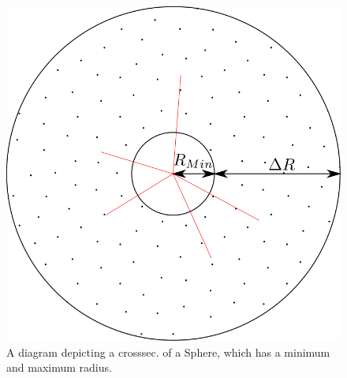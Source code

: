 \documentclass[12pt,a4paper]{article}
\begin{document}
\begin{figure}[h!]
\centering
\includegraphics[scale=0.2]{Images//Materials//RMAX.png}
\caption[width=\columnwidth]{A diagram depicting a crosssec. of a Sphere, which has a minimum and maximum radius.}
\label{deltar}
\end{figure}

\newpage
\end{document}
